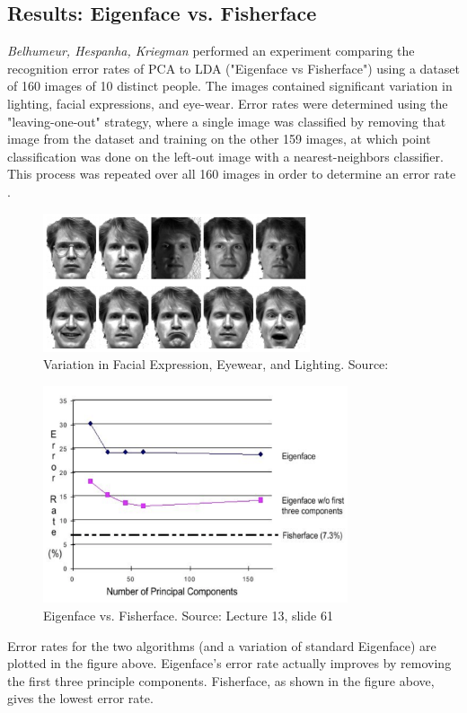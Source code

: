 \documentclass{article}
\begin{document}
\subsection{Results: Eigenface vs. Fisherface}
\textit{Belhumeur, Hespanha, Kriegman} performed an experiment comparing the recognition error rates of PCA to LDA ("Eigenface vs Fisherface") using a dataset of 160 images of 10 distinct people. The images contained significant variation in lighting, facial expressions, and eye-wear. Error rates were determined using the "leaving-one-out" strategy, where a single image was classified by removing that image from the dataset and training on the other 159 images, at which point classification was done on the left-out image with a nearest-neighbors classifier. This process was repeated over all 160 images in order to determine an error rate \cite{EigenfacesvsFisherfaces}.

\begin{figure}[H]
  \centering
  \includegraphics[width=0.7\textwidth]{variation_in_expression}
  \caption{Variation in Facial Expression, Eyewear, and Lighting. Source: \cite{EigenfacesvsFisherfaces}}
\end{figure}

\begin{figure}[H]
  \centering
  \includegraphics[width=0.8\textwidth]{error_rate}
  \caption{Eigenface vs. Fisherface. Source: Lecture 13, slide 61}
\end{figure}

Error rates for the two algorithms (and a variation of standard Eigenface) are plotted in the figure above. Eigenface's error rate actually improves by removing the first three principle components. Fisherface, as shown in the figure above, gives the lowest error rate.


\small


\end{document}
